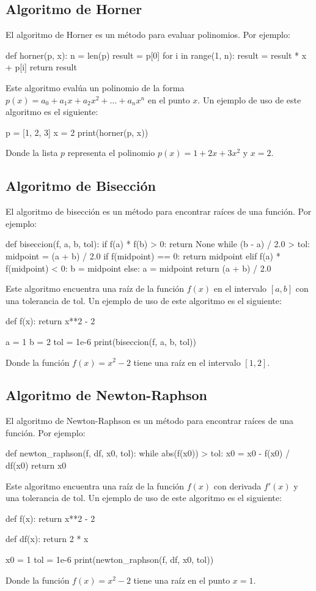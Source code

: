 \documentclass{article}
\begin{document}
\subsection{Algoritmo de Horner}
El algoritmo de Horner es un método para evaluar polinomios. Por ejemplo:
\begin{python_code}
def horner(p, x):
    n = len(p)
    result = p[0]
    for i in range(1, n):
        result = result * x + p[i]
    return result
\end{python_code}
Este algoritmo evalúa un polinomio de la forma $p(x) = a_0 + a_1x + a_2x^2 + \ldots + a_nx^n$ en el punto $x$.
Un ejemplo de uso de este algoritmo es el siguiente:
\begin{python_code}
p = [1, 2, 3]
x = 2
print(horner(p, x))
\end{python_code}
Donde la lista $p$ representa el polinomio $p(x) = 1 + 2x + 3x^2$ y $x = 2$.

\subsection{Algoritmo de Bisección}
El algoritmo de bisección es un método para encontrar raíces de una función. Por ejemplo:
\begin{python_code}
def biseccion(f, a, b, tol):
    if f(a) * f(b) > 0:
        return None
    while (b - a) / 2.0 > tol:
        midpoint = (a + b) / 2.0
        if f(midpoint) == 0:
            return midpoint
        elif f(a) * f(midpoint) < 0:
            b = midpoint
        else:
            a = midpoint
    return (a + b) / 2.0
\end{python_code}
Este algoritmo encuentra una raíz de la función $f(x)$ en el intervalo $[a, b]$ con una tolerancia de $\text{tol}$.
Un ejemplo de uso de este algoritmo es el siguiente:
\begin{python_code}
def f(x):
    return x**2 - 2

a = 1
b = 2
tol = 1e-6
print(biseccion(f, a, b, tol))
\end{python_code}
Donde la función $f(x) = x^2 - 2$ tiene una raíz en el intervalo $[1, 2]$.

\subsection{Algoritmo de Newton-Raphson}
El algoritmo de Newton-Raphson es un método para encontrar raíces de una función. Por ejemplo:
\begin{python_code}
def newton_raphson(f, df, x0, tol):
    while abs(f(x0)) > tol:
        x0 = x0 - f(x0) / df(x0)
    return x0
\end{python_code}
Este algoritmo encuentra una raíz de la función $f(x)$ con derivada $f'(x)$ y una tolerancia de $\text{tol}$.
Un ejemplo de uso de este algoritmo es el siguiente:
\begin{python_code}
def f(x):
    return x**2 - 2

def df(x):
    return 2 * x

x0 = 1
tol = 1e-6
print(newton_raphson(f, df, x0, tol))
\end{python_code}
Donde la función $f(x) = x^2 - 2$ tiene una raíz en el punto $x = 1$.
\end{document}
